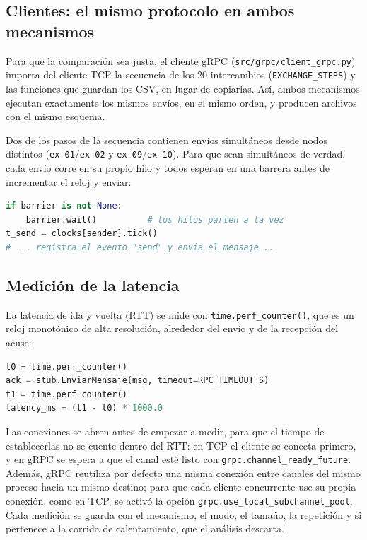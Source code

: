 \documentclass[12pt,a4paper]{article}
\begin{document}
\subsection{Clientes: el mismo protocolo en ambos mecanismos}

Para que la comparación sea justa, el cliente gRPC (\texttt{src/grpc/client\_grpc.py}) importa del cliente TCP la secuencia de los 20 intercambios (\texttt{EXCHANGE\_STEPS}) y las funciones que guardan los CSV, en lugar de copiarlas. Así, ambos mecanismos ejecutan exactamente los mismos envíos, en el mismo orden, y producen archivos con el mismo esquema.

Dos de los pasos de la secuencia contienen envíos simultáneos desde nodos distintos (\texttt{ex-01}/\texttt{ex-02} y \texttt{ex-09}/\texttt{ex-10}). Para que sean simultáneos de verdad, cada envío corre en su propio hilo y todos esperan en una barrera antes de incrementar el reloj y enviar:

\begin{lstlisting}[language=Python, caption={Envío simultáneo con barrera en los clientes.}, label={lst:barrera}]
if barrier is not None:
    barrier.wait()          # los hilos parten a la vez
t_send = clocks[sender].tick()
# ... registra el evento "send" y envia el mensaje ...
\end{lstlisting}

\subsection{Medición de la latencia}

La latencia de ida y vuelta (RTT) se mide con \texttt{time.perf\_counter()}, que es un reloj monotónico de alta resolución, alrededor del envío y de la recepción del acuse:

\begin{lstlisting}[language=Python, caption={Medición del RTT en el cliente gRPC (el cliente TCP es equivalente).}, label={lst:rtt}]
t0 = time.perf_counter()
ack = stub.EnviarMensaje(msg, timeout=RPC_TIMEOUT_S)
t1 = time.perf_counter()
latency_ms = (t1 - t0) * 1000.0
\end{lstlisting}

Las conexiones se abren antes de empezar a medir, para que el tiempo de establecerlas no se cuente dentro del RTT: en TCP el cliente se conecta primero, y en gRPC se espera a que el canal esté listo con \texttt{grpc.channel\_ready\_future}. Además, gRPC reutiliza por defecto una misma conexión entre canales del mismo proceso hacia un mismo destino; para que cada cliente concurrente use su propia conexión, como en TCP, se activó la opción \texttt{grpc.use\_local\_subchannel\_pool}. Cada medición se guarda con el mecanismo, el modo, el tamaño, la repetición y si pertenece a la corrida de calentamiento, que el análisis descarta.
\end{document}
